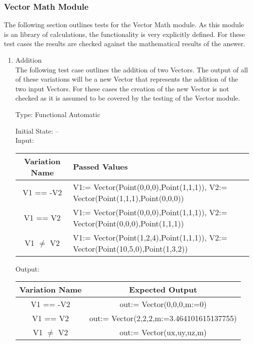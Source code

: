 \documentclass[12pt, titlepage]{article}
\begin{document}
\subsubsection{Vector Math Module}
The following section outlines tests for the Vector Math module. As this module 
is an library of calculations, the functionality is very explicitly defined. 
For these test cases the results are checked against the mathematical results 
of the answer.

\begin{enumerate}
	
	\item{Addition\\}
	The following test case outlines the addition of two Vectors. The output of 
	all of these variations will be a new Vector that represents the addition 
	of the two input Vectors. For these cases the creation of the new Vector is 
	not checked as it is assumed to be covered by the testing of the Vector 
	module.
	
	Type: Functional Automatic
	
	Initial State: -- \\
	
	Input: 
	\begin{tabular}{|c|p{8cm}|}
		\hline
		\textbf{Variation Name} & \textbf{Passed Values}\\
		\hline
		V1 == -V2 & V1:= Vector(Point(0,0,0),Point(1,1,1)), V2:= 
		Vector(Point(1,1,1),Point(0,0,0))\\
		V1 == V2 & V1:= Vector(Point(0,0,0),Point(1,1,1)), V2:= 
		Vector(Point(0,0,0),Point(1,1,1))\\
		V1 $\neq$ V2 & V1:= Vector(Point(1,2,4),Point(1,1,1)), V2:= 
		Vector(Point(10,5,0),Point(1,3,2))\\
		\hline
	\end{tabular}
	
	Output: 
	\begin{tabular}{|c|c|}
		\hline
		\textbf{Variation Name} & \textbf{Expected Output}\\
		\hline
		V1 == -V2 & out:= Vector(0,0,0,m:=0)\\
		V1 == V2 & out:= Vector(2,2,2,m:=3.464101615137755‬)\\
		V1 $\neq$ V2 & out:= Vector(ux,uy,uz,m)\\		
		\hline
	\end{tabular}
	

\end{enumerate}
\end{document}
